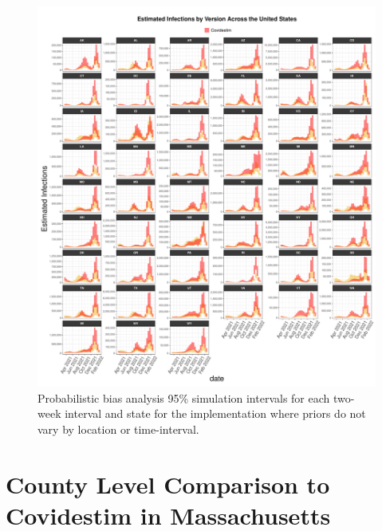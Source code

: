 \documentclass[12pt,twoside]{smiththesis}
\begin{document}
\newpage
\begin{figure}

{\centering \includegraphics[width=1\linewidth]{figure/all-states-first-impl} 

}

\caption{\label{fig:all-states-first-impl}  Probabilistic bias analysis 95\% simulation intervals for each two-week interval and state for the implementation where priors do not vary by location or time-interval.}\label{fig:unnamed-chunk-112}
\end{figure}
\hypertarget{county-level-comparison-to-covidestim-in-massachusetts}{%
\section{County Level Comparison to Covidestim in Massachusetts}\label{county-level-comparison-to-covidestim-in-massachusetts}}
\end{document}
